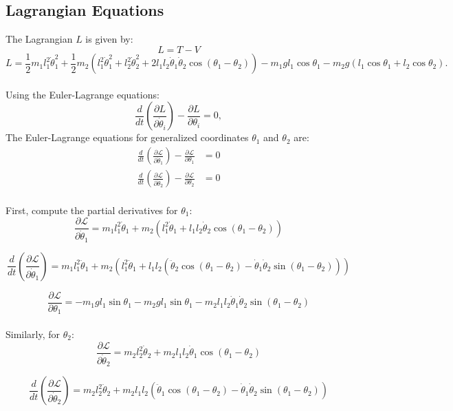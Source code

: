 \documentclass{article}
\begin{document}
\subsection{Lagrangian Equations}
The Lagrangian \(L\) is given by:
\[L = T - V \]
\[L = \frac{1}{2} m_1 l_1^2 \dot{\theta}_1^2 + \frac{1}{2} m_2 \left(l_1^2 \dot{\theta}_1^2 + l_2^2 \dot{\theta}_2^2 + 2 l_1 l_2 \dot{\theta}_1 \dot{\theta}_2 \cos(\theta_1 - \theta_2)\right) - m_1 g l_1 \cos \theta_1 - m_2 g (l_1 \cos \theta_1 + l_2 \cos \theta_2).
\]
\\
Using the Euler-Lagrange equations:
\[
\frac{d}{dt} \left( \frac{\partial L}{\partial \dot{\theta}_i} \right) - \frac{\partial L}{\partial \theta_i} = 0,
\]
The Euler-Lagrange equations for generalized coordinates \(\theta_1\) and \(\theta_2\) are:
\begin{align}
\frac{d}{dt} \left( \frac{\partial \mathcal{L}}{\partial \dot{\theta}_1} \right) - \frac{\partial \mathcal{L}}{\partial \theta_1} &= 0 \label{eq:euler-lagrange1} \\
\frac{d}{dt} \left( \frac{\partial \mathcal{L}}{\partial \dot{\theta}_2} \right) - \frac{\partial \mathcal{L}}{\partial \theta_2} &= 0 \label{eq:euler-lagrange2}
\end{align}
\\
First, compute the partial derivatives for \(\theta_1\):
\[\frac{\partial \mathcal{L}}{\partial \dot{\theta}_1} = m_1 l_1^2 \dot{\theta}_1 + m_2 \left( l_1^2 \dot{\theta}_1 + l_1 l_2 \dot{\theta}_2 \cos(\theta_1 - \theta_2) \right)\]

\[\frac{d}{dt} \left( \frac{\partial \mathcal{L}}{\partial \dot{\theta}_1} \right) = m_1 l_1^2 \ddot{\theta}_1 + m_2 \left( l_1^2 \ddot{\theta}_1 + l_1 l_2 \left( \ddot{\theta}_2 \cos(\theta_1 - \theta_2) - \dot{\theta}_1 \dot{\theta}_2 \sin(\theta_1 - \theta_2) \right) \right)\]

\[\frac{\partial \mathcal{L}}{\partial \theta_1} = -m_1 g l_1 \sin \theta_1 - m_2 g l_1 \sin \theta_1 - m_2 l_1 l_2 \dot{\theta}_1 \dot{\theta}_2 \sin(\theta_1 - \theta_2)\]
\\
Similarly, for \(\theta_2\):
\[
\frac{\partial \mathcal{L}}{\partial \dot{\theta}_2} = m_2 l_2^2 \dot{\theta}_2 + m_2 l_1 l_2 \dot{\theta}_1 \cos(\theta_1 - \theta_2)
\]

\[
\frac{d}{dt} \left( \frac{\partial \mathcal{L}}{\partial \dot{\theta}_2} \right) = m_2 l_2^2 \ddot{\theta}_2 + m_2 l_1 l_2 \left( \ddot{\theta}_1 \cos(\theta_1 - \theta_2) - \dot{\theta}_1 \dot{\theta}_2 \sin(\theta_1 - \theta_2) \right)
\]
\end{document}
